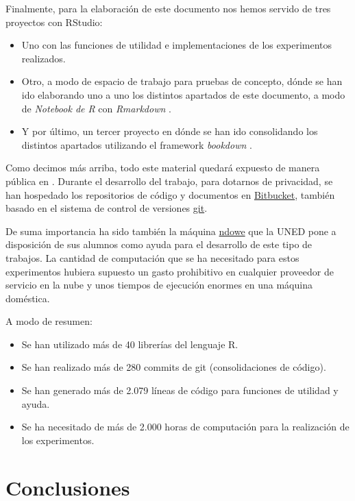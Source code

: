 \documentclass[]{book}
\begin{document}
Finalmente, para la elaboración de este documento nos hemos servido de
tres proyectos con RStudio:

\begin{itemize}
\item
  Uno con las funciones de utilidad e implementaciones de los
  experimentos realizados.
\item
  Otro, a modo de espacio de trabajo para pruebas de concepto, dónde se
  han ido elaborando uno a uno los distintos apartados de este
  documento, a modo de \emph{Notebook de R} con \emph{Rmarkdown}
  \citep{R-rmarkdown}.
\item
  Y por último, un tercer proyecto en dónde se han ido consolidando los
  distintos apartados utilizando el framework \emph{bookdown}
  \citep{R-bookdown}.
\end{itemize}

Como decimos más arriba, todo este material quedará expuesto de manera
pública en \citep{amanas-github}. Durante el desarrollo del trabajo,
para dotarnos de privacidad, se han hospedado los repositorios de código
y documentos en \href{https://bitbucket.org}{Bitbucket}, también basado
en el sistema de control de versiones \href{https://git-scm.com/}{git}.

De suma importancia ha sido también la máquina
\href{http://ndowe.ia.uned.es:8787/}{ndowe} que la UNED pone a
disposición de sus alumnos como ayuda para el desarrollo de este tipo de
trabajos. La cantidad de computación que se ha necesitado para estos
experimentos hubiera supuesto un gasto prohibitivo en cualquier
proveedor de servicio en la nube y unos tiempos de ejecución enormes en
una máquina doméstica.

A modo de resumen:

\begin{itemize}
\item
  Se han utilizado más de 40 librerías del lenguaje R.
\item
  Se han realizado más de 280 commits de git (consolidaciones de
  código).
\item
  Se han generado más de 2.079 líneas de código para funciones de
  utilidad y ayuda.
\item
  Se ha necesitado de más de 2.000 horas de computación para la
  realización de los experimentos.
\end{itemize}

\chapter{Conclusiones}\label{conclusiones}
\end{document}
